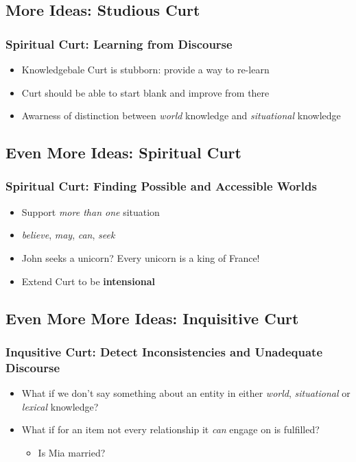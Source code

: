 \documentclass{beamer}
\newcommand{\stress}{\textbf}
\begin{document}
\subsection{More Ideas: Studious Curt}
\begin{frame}
\frametitle{Spiritual Curt: Learning from Discourse}
  \begin{itemize}
    \item Knowledgebale Curt is stubborn: provide a way to re-learn
    \item Curt should be able to start blank and improve from there
    \item Awarness of distinction between \emph{world} knowledge and
    \emph{situational} knowledge
  \end{itemize}
\end{frame}

\subsection{Even More Ideas: Spiritual Curt}
\begin{frame}
\frametitle{Spiritual Curt: Finding Possible and Accessible Worlds}
  \begin{itemize}
    \item Support \emph{more than one} situation
    \item \emph{believe}, \emph{may}, \emph{can}, \emph{seek}
    \item John seeks a unicorn? Every unicorn is a king of France!
    \item Extend Curt to be \stress{intensional}
  \end{itemize}
\end{frame}

\subsection{Even More More Ideas: Inquisitive Curt}
\begin{frame}
  \frametitle{Inqusitive Curt: Detect Inconsistencies and Unadequate Discourse}
  \begin{itemize}
    \item What if we don't say something about an entity in either
    \emph{world}, \emph{situational} or \emph{lexical} knowledge?
    \item What if for an item not every relationship it \emph{can} engage on is
    fulfilled?
    \begin{itemize}
      \item Is Mia married?
    \end{itemize}
  \end{itemize}
\end{frame}
\end{document}
